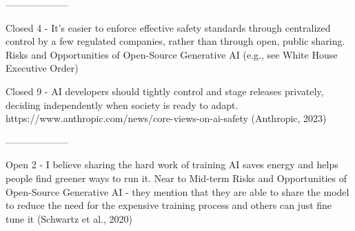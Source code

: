 --------------------

Closed 4 - It's easier to enforce effective safety standards through centralized control by a few regulated companies, rather than through open, public sharing.
Risks and Opportunities of Open-Source Generative AI
(e.g., see White House Executive Order)
\citep{the_white_house_fact_2023}

Closed 9 - AI developers should tightly control and stage releases privately, deciding independently when society is ready to adapt.
https://www.anthropic.com/news/core-views-on-ai-safety
(Anthropic, 2023)
\citep{anthropic_core_2023}

--------------------

Open 2 - I believe sharing the hard work of training AI saves energy and helps people find greener ways to run it.
Near to Mid-term Risks and Opportunities of Open-Source Generative AI
\citep{touvron_llama_2023} - they mention that they are able to share the model to reduce the need for the expensive training process and others can just fine tune it
(Schwartz et al., 2020)
\citep{schwartz_green_2019}